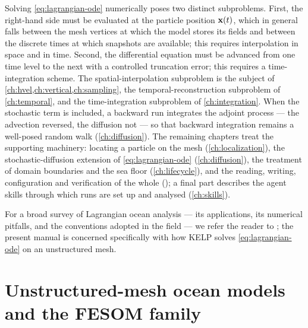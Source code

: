 Solving \cref{eq:lagrangian-ode} numerically poses two distinct subproblems.
First, the right-hand side must be evaluated at the particle position $\mathbf{x}(t)$,
which in general falls between the mesh vertices at which the model stores its
fields and between the discrete times at which snapshots are available; this
requires interpolation in space and in time. Second, the differential equation
must be advanced from one time level to the next with a controlled truncation
error; this requires a time-integration scheme. The spatial-interpolation
subproblem is the subject of \cref{ch:hvel,ch:vertical,ch:sampling}, the
temporal-reconstruction subproblem of \cref{ch:temporal}, and the
time-integration subproblem of \cref{ch:integration}. When the stochastic term is included, a
backward run integrates the adjoint process --- the advection reversed, the diffusion not --- so that
backward integration remains a well-posed random walk (\cref{ch:diffusion}). The remaining chapters treat
the supporting machinery: locating a particle on the mesh (\cref{ch:localization}),
the stochastic-diffusion extension of \cref{eq:lagrangian-ode}
(\cref{ch:diffusion}), the treatment of domain boundaries and the sea floor
(\cref{ch:lifecycle}), and the reading, writing, configuration and verification of
the whole (); a final part describes the agent skills through which
runs are set up and analysed (\cref{ch:skills}).

For a broad survey of Lagrangian ocean analysis --- its applications, its
numerical pitfalls, and the conventions adopted in the field --- we refer the
reader to \citet{vansebille2018lagrangian}; the present manual is concerned
specifically with how \textsf{KELP} solves \cref{eq:lagrangian-ode} on an
unstructured mesh.

\section{Unstructured-mesh ocean models and the FESOM family}\label{sec:intro-fesom2}

